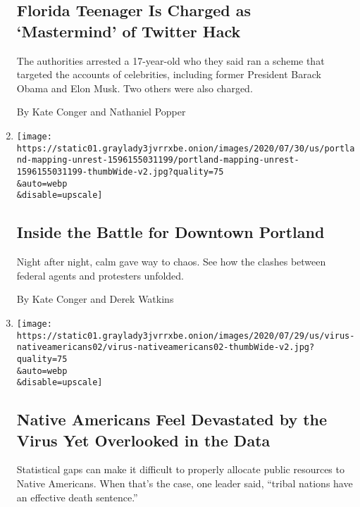 \begin{enumerate}
{  \subsection{Florida Teenager Is Charged as `Mastermind' of Twitter
  Hack}\label{florida-teenager-is-charged-as-mastermind-of-twitter-hack}}

  The authorities arrested a 17-year-old who they said ran a scheme that
  targeted the accounts of celebrities, including former President
  Barack Obama and Elon Musk. Two others were also charged.

  By Kate Conger and Nathaniel Popper
\item
  \href{/interactive/2020/07/31/us/portland-protests-map-photos.html}{}

  \texttt{[image: https://static01.graylady3jvrrxbe.onion/images/2020/07/30/us/portland-mapping-unrest-1596155031199/portland-mapping-unrest-1596155031199-thumbWide-v2.jpg?quality=75\\\&auto=webp\\\&disable=upscale]}

  \hypertarget{inside-the-battle-for-downtown-portland}{%
  \subsection{Inside the Battle for Downtown
  Portland}\label{inside-the-battle-for-downtown-portland}}

  Night after night, calm gave way to chaos. See how the clashes between
  federal agents and protesters unfolded.

  By Kate Conger and Derek Watkins
\item
  \href{/2020/07/30/us/native-americans-coronavirus-data.html}{}

  \texttt{[image: https://static01.graylady3jvrrxbe.onion/images/2020/07/29/us/virus-nativeamericans02/virus-nativeamericans02-thumbWide-v2.jpg?quality=75\\\&auto=webp\\\&disable=upscale]}

  \hypertarget{native-americans-feel-devastated-by-the-virus-yet-overlooked-in-the-data}{%
  \subsection{Native Americans Feel Devastated by the Virus Yet
  Overlooked in the
  Data}\label{native-americans-feel-devastated-by-the-virus-yet-overlooked-in-the-data}}

  Statistical gaps can make it difficult to properly allocate public
  resources to Native Americans. When that's the case, one leader said,
  ``tribal nations have an effective death sentence.''


\end{enumerate}
